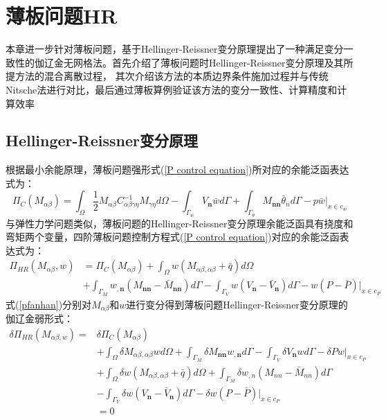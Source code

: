 \chapter{薄板问题HR}
本章进一步针对薄板问题，基于Hellinger-Reissner变分原理提出了一种满足变分一致性的伽辽金无网格法。首先介绍了薄板问题时Hellinger-Reissner变分原理及其所提方法的混合离散过程，
其次介绍该方法的本质边界条件施加过程并与传统Nitsche法进行对比，最后通过薄板算例验证该方法的变分一致性、计算精度和计算效率
\section{Hellinger-Reissner变分原理}
根据最小余能原理，薄板问题强形式(\ref{P control equation})所对应的余能泛函表达式为：
\begin{equation}
\Pi_C(M_{\alpha\beta})=\int_{\Omega}\frac{1}{2}M_{\alpha\beta}C^{-1}_{\alpha\beta\gamma\eta}M_{\gamma\eta}d\Omega-\int_{\Gamma_w}V_{\pmb n}\bar{w}d\Gamma+\int_{\Gamma_{\theta}}M_{\pmb{nn}}\bar{\theta}_nd\Gamma-p\bar{w}\vert_{x\in{c_w}}
\end{equation}
与弹性力学问题类似，薄板问题的Hellinger-Reissner变分原理余能泛函具有挠度和弯矩两个变量\cite{}，四阶薄板问题控制方程式(\ref{P control equation})对应的余能泛函表达式为：
\begin{equation}\label{pfanhan}
\begin{split}
    \Pi_{H\!R}(M_{\alpha\beta},w)&=\Pi_C(M_{\alpha\beta})+\int_{\Omega}w(M_{\alpha\beta,\alpha\beta}+\bar{q})d\Omega\\
    &+\int_{\Gamma_M}w_{,\pmb n}(M_{\pmb{nn}}-\bar{M}_{\pmb{nn}})d\Gamma
    -\int_{\Gamma_V}w(V_{\pmb n}-\bar{V}_{\pmb n})d\Gamma-w(P-\bar{P})\vert_{x\in{c_P}}
\end{split}
\end{equation}
式(\ref{pfanhan})分别对$M_{\alpha\beta}$和$w$进行变分得到薄板问题Hellinger-Reissner变分原理的伽辽金弱形式：
\begin{equation}\label{Pweakfrom}
\begin{split}
    \delta\Pi_{H\!R}(M_{\alpha\beta,w})=&\delta\Pi_C(M_{\alpha\beta})\\
    &+\int_{\Omega}\delta M_{\alpha\beta,\alpha\beta}wd\Omega+\int_{\Gamma_M}\delta M_{\pmb{nn}}w_{,\pmb n}d\Gamma-\int_{\Gamma_V}\delta V_{\pmb n}wd\Gamma-\delta Pw\vert_{x\in{c_P}}\\
    &+\int_{\Omega}\delta w(M_{\alpha\beta,\alpha\beta}+\bar{q})d\Omega+\int_{\Gamma_M}\delta w_{,n}(M_{nn}-\bar{M}_{nn})d\Gamma\\
    &-\int_{\Gamma_V}\delta w(V_{\pmb n}-\bar{V}_{\pmb n})d\Gamma-\delta w(P-\bar{P})\vert_{x\in{c_P}}\\
    &=0
\end{split}
\end{equation}\par
